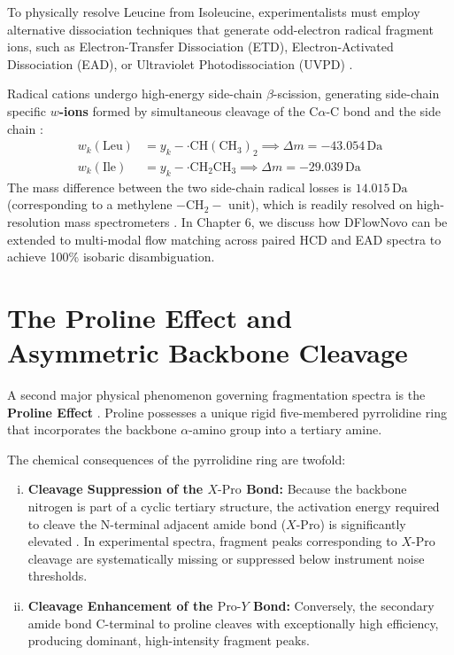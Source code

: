 To physically resolve Leucine from Isoleucine, experimentalists must employ alternative dissociation techniques that generate odd-electron radical fragment ions, such as Electron-Transfer Dissociation (ETD), Electron-Activated Dissociation (EAD), or Ultraviolet Photodissociation (UVPD) \citep{Johnson1987, Lebedev2014}.

Radical cations undergo high-energy side-chain $\beta$-scission, generating side-chain specific \textbf{$w$-ions} formed by simultaneous cleavage of the C$\alpha$-C bond and the side chain \citep{Johnson1987}:
\begin{align}
w_k(\text{Leu}) &= y_k - \cdot\text{CH}(\text{CH}_3)_2 \implies \Delta m = -43.054\,\text{Da} \label{eq:w_leu} \\
w_k(\text{Ile}) &= y_k - \cdot\text{CH}_2\text{CH}_3 \implies \Delta m = -29.039\,\text{Da} \label{eq:w_ile}
\end{align}
The mass difference between the two side-chain radical losses is $14.015\,\text{Da}$ (corresponding to a methylene $-\text{CH}_2-$ unit), which is readily resolved on high-resolution mass spectrometers \citep{Lebedev2014}. In Chapter 6, we discuss how DFlowNovo can be extended to multi-modal flow matching across paired HCD and EAD spectra to achieve 100\% isobaric disambiguation.

\section{The Proline Effect and Asymmetric Backbone Cleavage}

A second major physical phenomenon governing fragmentation spectra is the \textbf{Proline Effect} \citep{Breci2003, Paizs2005}. Proline possesses a unique rigid five-membered pyrrolidine ring that incorporates the backbone $\alpha$-amino group into a tertiary amine.

The chemical consequences of the pyrrolidine ring are twofold:
\begin{enumerate}[(i)]
\item \textbf{Cleavage Suppression of the $X\text{-Pro}$ Bond:} Because the backbone nitrogen is part of a cyclic tertiary structure, the activation energy required to cleave the N-terminal adjacent amide bond ($X\text{-Pro}$) is significantly elevated \citep{Breci2003}. In experimental spectra, fragment peaks corresponding to $X\text{-Pro}$ cleavage are systematically missing or suppressed below instrument noise thresholds.
\item \textbf{Cleavage Enhancement of the $\text{Pro-}Y$ Bond:} Conversely, the secondary amide bond C-terminal to proline cleaves with exceptionally high efficiency, producing dominant, high-intensity fragment peaks.
\end{enumerate}

